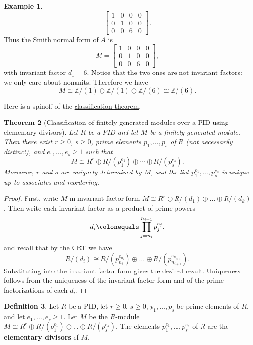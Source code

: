 \documentclass[12pt]{report}
\newtheorem{theorem}{Theorem}[chapter]
\numberwithin{equation}{section}
\numberwithin{theorem}{chapter}
\theoremstyle{definition}
\newtheorem{definition}[theorem]{Definition}
\newtheorem{example}[theorem]{Example}
\newtheorem*{basic properties}{Basic Properties}
\newtheorem*{Important Remark}{Important Remark}
\newcommand{\df}[1]{{\bf #1}\index{#1}}
\begin{document}
\begin{example}
$$\begin{bmatrix}
1 & 0 & 0  & 0 \\
0 & 1 & 0 & 0\\
0 & 0 & 6 & 0
\end{bmatrix}
.$$
Thus the Smith normal form of $A$ is 
$$M=\begin{bmatrix}
1 & 0 & 0 & 0 \\
0 & 1 & 0 & 0 \\
0 & 0 & 6 & 0
\end{bmatrix},$$
with invariant factor $d_1=6$. Notice that the two ones are not invariant factors: we only care about nonunits. Therefore we have 
$$M\cong \mathbb{Z}/(1)\oplus \mathbb{Z}/(1)\oplus \mathbb{Z}/(6)\cong \mathbb{Z}/(6).$$
\end{example}


Here is a spinoff of the \hyperref[classification mods over pids]{classification theorem}.


\begin{theorem}[Classification of finitely generated modules over a PID using elementary divisors]\label{classification elementary divisors}
Let $R$ be a PID and let $M$ be a finitely generated module. Then there exist $r \geqslant 0$, $s \geqslant 0$, prime elements $p_1,\ldots,p_s$ of $R$ (not necessarily distinct), and $e_1,\ldots ,e_s \geqslant 1$ such that 
$$M \cong R^r \oplus R/(p_1^{e_1}) \oplus \cdots \oplus R/(p_s^{e_s}).$$
Moreover, $r$ and $s$ are uniquely determined by $M$, and the list $p_1^{e_1},\ldots, p_s^{e_s}$ is unique up to associates and reordering.
\end{theorem}
 
\begin{proof}
First, write $M$ in invariant factor form $M \cong R^r \oplus R/(d_1) \oplus \dots \oplus R/(d_k)$. Then write each invariant factor as a product of prime powers 
$$d_i \colonequals \prod_{j=n_i}^{n_{i+1}} p_j^{e_j},$$ 
and recall that by the CRT we have
$$R/(d_i)\cong R/(p_{n_i}^{e_{n_i}})\oplus\dots\oplus R/(p_{n_{i+1}}^{e_{n_{i+1}}}).$$ 
Substituting into the invariant factor form gives the desired result. Uniqueness follows from the uniqueness of the invariant factor form and of the prime factorizations of each $d_i$.
 \end{proof}



\begin{definition} 
Let $R$ be a PID, let $r \geqslant 0$, $s \geqslant 0$, $p_1,\ldots,p_s$ be prime elements of $R$, and let $e_1,\ldots,e_s \geqslant 1$. Let $M$ be the $R$-module $M \cong R^r \oplus R/(p_1^{e_1}) \oplus \dots \oplus R/(p_s^{e_s})$. The elements $p_1^{e_1},\ldots, p_s^{e_s}$ of $R$ are the \df{elementary divisors} of $M$.
\end{definition}
\end{document}
